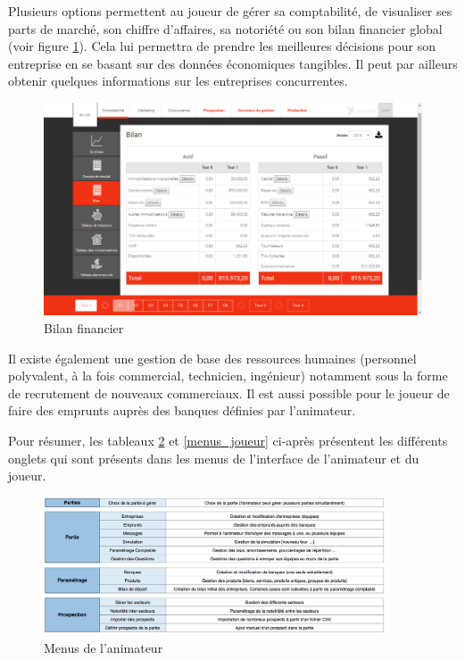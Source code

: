         Plusieurs options permettent au joueur de gérer sa comptabilité, de visualiser ses parts de marché, son chiffre d'affaires, sa notoriété ou son bilan financier global (voir figure \ref{bilan_financier}). Cela lui permettra de prendre les meilleures décisions pour son entreprise en se basant sur des données économiques tangibles. Il peut par ailleurs obtenir quelques informations sur les entreprises concurrentes.

        \begin{figure}\centering
            \includegraphics[scale=0.88]{images/bilan.png}
            \caption{Bilan financier}
            \label{bilan_financier}
        \end{figure}

        Il existe également une gestion de base des ressources humaines (personnel polyvalent, à la fois commercial, technicien, ingénieur) notamment sous la forme de recrutement de nouveaux commerciaux. Il est aussi possible pour le joueur de faire des emprunts auprès des banques définies par l'animateur.

        Pour résumer, les tableaux \ref{menus_animateur} et \ref{menus_joueur} ci-après présentent les différents onglets qui sont présents dans les menus de l'interface de l'animateur et du joueur.

        \begin{figure}\centering
            \includegraphics[width=0.9\textwidth]{images/menus_animateur_2.png}
            \caption{Menus de l'animateur}
            \label{menus_animateur}
        \end{figure}

